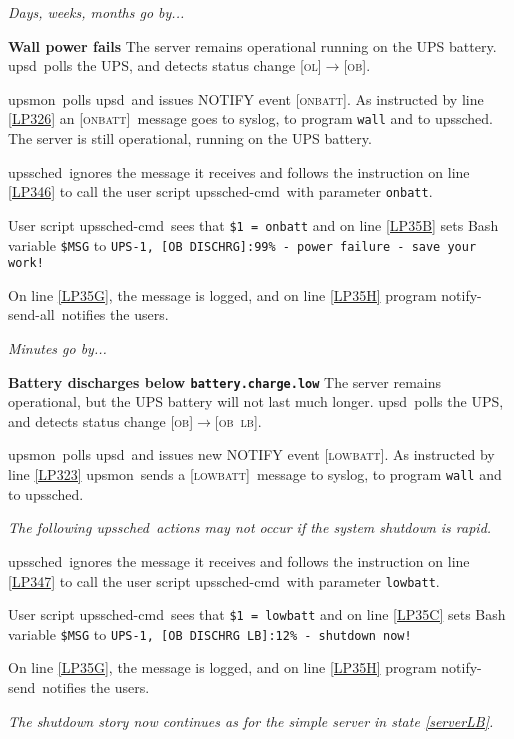 \documentclass[12pt]{article}
\newcommand{\upsd}{\mbox{\textcolor{UPSDCOLOUR}{upsd}}}
\newcommand{\upsmon}{\mbox{\textcolor{MONCOLOUR}{upsmon}}}
\newcommand{\upssched}{\mbox{\textcolor{SCHEDCOLOUR}{upssched}}}
\newcommand{\upsschedcmd}{\mbox{\textcolor{CMDCOLOUR}{upssched-cmd}}}
\newcommand{\notifysend}{\mbox{\textcolor{NOTIFYCOLOUR}{notify-send}}}
\newcommand{\notifysendall}{\mbox{\textcolor{NOTIFYCOLOUR}{notify-send-all}}}
\newcommand{\LB}{\textcolor{UPSDCOLOUR}{\textsc{lb}}}
\newcommand{\OB}{\textcolor{UPSDCOLOUR}{\textsc{ob}}}
\newcommand{\OL}{\textcolor{UPSDCOLOUR}{\textsc{ol}}}
\newcommand{\ONBATT}{\textcolor{MONCOLOUR}{\textsc{onbatt}}}
\newcommand{\LOWBATT}{\textcolor{MONCOLOUR}{\textsc{lowbatt}}}
\newcommand{\status}[1]{\textcolor{UPSDCOLOUR}{[{#1}]}}
\newcommand{\statuschange}[2]{\status{#1}{\allowbreak}\textcolor{UPSDCOLOUR}{$\rightarrow$}{\allowbreak}\status{#2}}
\newcommand{\NOTev}[1]{\textcolor{MONCOLOUR}{[{#1}]}}
\newcommand{\li}{\item}                 %
\newcommand{\Ref}[1]{\ref{#1}}
\begin{document}
\textsl{Days, weeks, months go by...}

\li \textbf{Wall power fails} \quad The server remains operational running on
the UPS battery.  \upsd\ polls the UPS, and detects status change
\statuschange{\OL}{\OB}.

\li \upsmon\ polls \upsd\ and issues NOTIFY event \NOTev{\ONBATT}.  As
instructed by line \ref{LP326} an \NOTev{\ONBATT}\ message goes to syslog, to
program \texttt{wall} and to \upssched.  The server is still operational,
running on the UPS battery.

\li \upssched\ ignores the message it receives and follows the instruction on
line \ref{LP346} to call the user script \upsschedcmd\ with parameter
\texttt{onbatt}.

\li User script \upsschedcmd\ sees that \texttt{\$1 = onbatt} and on line
\ref{LP35B} sets Bash variable \texttt{\$MSG} to
\verb`UPS-1, [OB DISCHRG]:99% - power failure - save your work!`

\li On line \ref{LP35G}, the message is logged, and on line \ref{LP35H} program 
\notifysendall\ notifies the users.

\textsl{Minutes go by...}

\li \textbf{Battery discharges below \texttt{battery.charge.low}} \quad The
server remains operational, but the UPS battery will not last much longer.
\upsd\ polls the UPS, and detects status change
\statuschange{\OB}{\OB\ \LB}.

\li \upsmon\ polls \upsd\ and issues new NOTIFY event \NOTev{\LOWBATT}.  As
instructed by line \ref{LP323} \upsmon\ sends a \NOTev{\LOWBATT}\ message to
syslog, to program \texttt{wall} and to \upssched.

\textsl{The following \upssched\ actions may not occur if the system shutdown
  is rapid.}

\li \upssched\ ignores the message it receives and follows the instruction on
line \ref{LP347} to call the user script \upsschedcmd\ with parameter
\texttt{lowbatt}.

\li User script \upsschedcmd\ sees that \texttt{\$1 = lowbatt} and on line
\ref{LP35C} sets Bash variable \texttt{\$MSG} to
\verb`UPS-1, [OB DISCHRG LB]:12% - shutdown now!`

\li On line \ref{LP35G}, the message is logged, and on line \ref{LP35H} program 
\notifysend\ notifies the users.

\textsl{The shutdown story now continues as for the simple server in state
  \Ref{serverLB}.}
\end{document}
